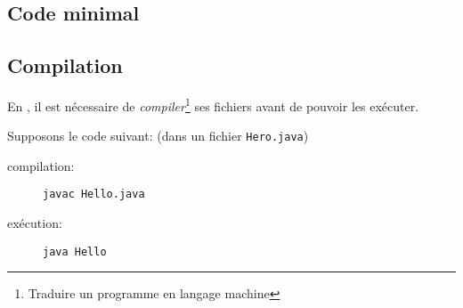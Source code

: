 			\subsection{Code minimal}
			
				
			
			\subsection{Compilation}
			
				En \lang, il est nécessaire de \emph{compiler}\footnote{Traduire un programme en langage \og machine\fg{}} ses fichiers avant de pouvoir les exécuter.
				
				Supposons le code suivant: (dans un fichier \lstinline|Hero.java|)
				
				
				\begin{description}
					\item[compilation:] \lstinline|javac Hello.java|
					\item[exécution:] \lstinline|java Hello|
				\end{description}
				
				
